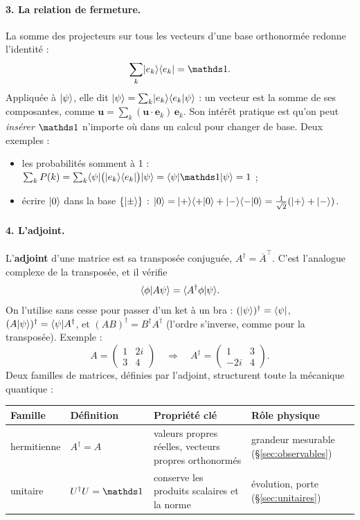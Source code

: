 \paragraph{3. La relation de fermeture.} La somme des projecteurs sur tous les vecteurs d'une base orthonormée redonne l'identité :
\[
\sum_k\ket{e_k}\bra{e_k}=\Id .
\]
Appliquée à $\lvert \psi\rangle$, elle dit $\lvert \psi\rangle=\sum_k\lvert e_k\rangle\langle e_k\vert \psi\rangle$ : un vecteur est la somme de ses composantes, comme $\mathbf u=\sum_k(\mathbf u\cdot\mathbf e_k)\,\mathbf e_k$. Son intérêt pratique est qu'on peut \emph{insérer} $\Id$ n'importe où dans un calcul pour changer de base. Deux exemples :
\begin{itemize}
\item les probabilités somment à 1 : $\sum_kP(k)=\sum_k\bra\psi\big(\ket{e_k}\bra{e_k}\big)\ket\psi=\bra\psi\Id\ket\psi=1$ ;
\item écrire $\lvert 0\rangle$ dans la base $\{\lvert \pm\rangle\}$ : $\lvert 0\rangle=\lvert +\rangle\langle +\vert 0\rangle+\lvert -\rangle\langle -\vert 0\rangle=\tfrac1{\sqrt2}(\lvert +\rangle+\lvert -\rangle)$.
\end{itemize}

\paragraph{4. L'adjoint.} L'\textbf{adjoint} d'une matrice est sa transposée conjuguée, $A^\dagger=\overline{A}^\top$. C'est l'analogue complexe de la transposée, et il vérifie
\[
\langle \phi\vert A\psi\rangle=\langle A^\dagger\phi\vert \psi\rangle.
\]
On l'utilise sans cesse pour passer d'un ket à un bra : $(\lvert \psi\rangle)^\dagger=\langle \psi\rvert$, $(A\lvert \psi\rangle)^\dagger=\langle \psi\rvert A^\dagger$, et $(AB)^\dagger=B^\dagger A^\dagger$ (l'ordre s'inverse, comme pour la transposée). Exemple :
\[
A=\begin{pmatrix}1&2i\\3&4\end{pmatrix}\quad\Longrightarrow\quad A^\dagger=\begin{pmatrix}1&3\\-2i&4\end{pmatrix}.
\]
Deux familles de matrices, définies par l'adjoint, structurent toute la mécanique quantique :
\begin{center}
\begin{tabularx}{\linewidth}{llXX}
\toprule
Famille & Définition & Propriété clé & Rôle physique \\
\midrule
hermitienne & $A^\dagger=A$ & valeurs propres réelles, vecteurs propres orthonormés & grandeur mesurable (§\ref{sec:observables}) \\
unitaire & $U^\dagger U=\Id$ & conserve les produits scalaires et la norme & évolution, porte (§\ref{sec:unitaires}) \\
\bottomrule
\end{tabularx}
\end{center}

